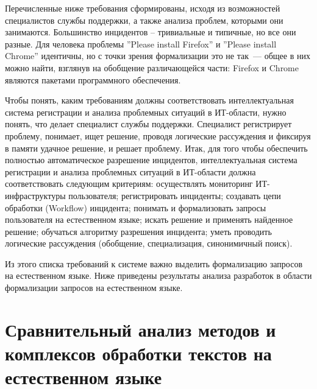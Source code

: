 Перечисленные ниже требования сформированы, исходя из возможностей специалистов службы поддержки, а также анализа проблем, которыми они занимаются. Большинство инцидентов – тривиальные и типичные, но все они разные. Для человека проблемы ”Please install Firefox” и ”Please install Chrome” идентичны, но с точки зрения формализации это не так~--- общее в них можно найти, взглянув на обобщение различающейся части: Firefox и Chrome являются пакетами программного обеспечения. \par 
Чтобы понять, каким требованиям должны соответствовать интеллектуальная система регистрации и анализа проблемных ситуаций в ИТ-области, нужно понять, что делает специалист службы поддержки. Специалист регистрирует проблему, понимает, ищет решение, проводя логические рассуждения и фиксируя в памяти удачное решение, и решает проблему. Итак, для того чтобы обеспечить полностью автоматическое разрешение инцидентов, интеллектуальная система регистрации и анализа проблемных ситуаций в ИТ-области должна соответствовать следующим критериям: осуществлять мониторинг ИТ-инфраструктуры пользователя; регистрировать инциденты; создавать цепи обработки (Workflow) инцидента; понимать и формализовать запросы пользователя на естественном языке; искать решение и применять найденное решение; обучаться алгоритму разрешения инцидента; уметь проводить логические рассуждения (обобщение, специализация, синонимичный поиск). \par
Из этого списка требований к системе важно выделить формализацию запросов на естественном языке. Ниже приведены результаты анализа разработок в области формализации запросов на естественном языке. 

\clearpage

\section{Сравнительный анализ методов и комплексов обработки текстов на естественном языке}



